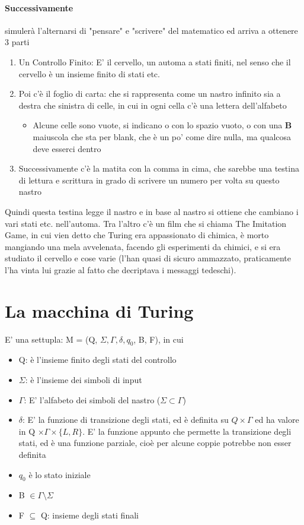 \documentclass[12pt, a4paper, openany, oneside]{book}
\begin{document}
	\paragraph{Successivamente }simulerà l'alternarsi di "pensare" e "scrivere" del
	matematico ed arriva a ottenere 3 parti
	\begin{enumerate}
		\item Un Controllo Finito: E' il cervello, un automa a stati finiti, nel 
		senso che il cervello è un insieme finito di stati etc.
		\item Poi c'è il foglio di carta: che si rappresenta come un nastro infinito
		sia a destra che sinistra di celle, in cui in ogni cella c'è una lettera
		dell'alfabeto
		\begin{itemize}
			\item Alcune celle sono vuote, si indicano o con lo spazio vuoto, o con
			una \textbf{B} maiuscola che sta per blank, che è un po' come dire nulla,
			ma qualcosa deve esserci dentro 
		\end{itemize}
		\item Successivamente c'è la matita con la comma in cima, che sarebbe una
		testina di lettura e scrittura in grado di scrivere un numero per volta su
		questo nastro
	\end{enumerate}
	Quindi questa testina legge il nastro e in base al nastro si ottiene che cambiano
	i vari stati etc. nell'automa. Tra l'altro c'è un film che si chiama The
	Imitation Game, in cui vien detto che Turing era appassionato di chimica, è
	morto mangiando una mela avvelenata, facendo gli esperimenti da chimici, e
	si era studiato il cervello e cose varie (l'han quasi di sicuro ammazzato, 
	praticamente l'ha vinta lui grazie al fatto che decriptava i messaggi tedeschi).
\section{La macchina di Turing}
E' una settupla: M = (Q, $\Sigma, \Gamma, \delta, q_{0}$, B, F), in cui
\begin{itemize}
	\item Q: è l'insieme finito degli stati del controllo
	\item $\Sigma$: è l'insieme dei simboli di input
	\item $\Gamma$: E' l'alfabeto dei simboli del nastro ($\Sigma \subset \Gamma$)
	\item $\delta$: E' la funzione di transizione degli stati, ed è definita su 
	$Q \times \Gamma$ ed ha valore in Q $\times \Gamma \times \{L, R\}$. E' la
	funzione appunto che permette la transizione degli stati, ed è una funzione
	parziale, cioè per alcune coppie potrebbe non esser definita
	\item $q_{0}$ è lo stato iniziale
	\item B $\in \Gamma \setminus \Sigma$
	\item F $\subseteq$ Q: insieme degli stati finali
\end{itemize}
\end{document}
